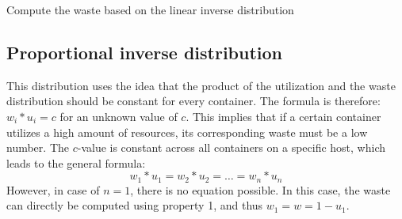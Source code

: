 \begin{algorithm}
    \caption{Compute the waste based on the linear inverse distribution}\label{alg:linear}
\end{algorithm}


\subsection{Proportional inverse distribution} \label{sec:proportional}
This distribution uses the idea that the product of the utilization and the waste distribution should be constant for every container. 
The formula is therefore: $w_i * u_i = c$ for an unknown value of $c$. This implies that if a certain container utilizes a high amount of resources, its corresponding waste must be a low number.
The $c$-value is constant across all containers on a specific host, which leads to the general formula: 
\begin{equation} \label{eq:constant}
w_1 * u_1 = w_2 * u_2 = \dots = w_n * u_n
\end{equation}
However, in case of $n = 1$, there is no equation possible. In this case, the waste can directly be computed using property 1, and thus $w_1 = w = 1 - u_1$.\\

